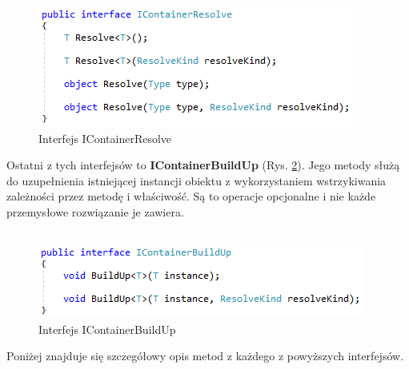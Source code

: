 \documentclass[12pt]{article}
\begin{document}
\begin{figure}[H]
	\begin{center}
  		\includegraphics{IContainerResolve.png}
  		\caption{Interfejs IContainerResolve}
  		\label{fig:IContainerResolve}
	\end{center}
\end{figure}
Ostatni z tych interfejsów to \textbf{IContainerBuildUp} (Rys. \ref{fig:IContainerBuildUp}). Jego metody służą do uzupełnienia istniejącej instancji obiektu z wykorzystaniem wstrzykiwania zależności przez metodę i właściwość. Są to operacje opcjonalne i nie każde przemysłowe rozwiązanie je zawiera.\\ \\
\begin{figure}[H]
	\begin{center}
  		\includegraphics{IContainerBuildUp.png}
  		\caption{Interfejs IContainerBuildUp}
  		\label{fig:IContainerBuildUp}
	\end{center}
\end{figure}
Poniżej znajduje się szczegółowy opis metod z każdego z powyższych interfejsów.
\end{document}

